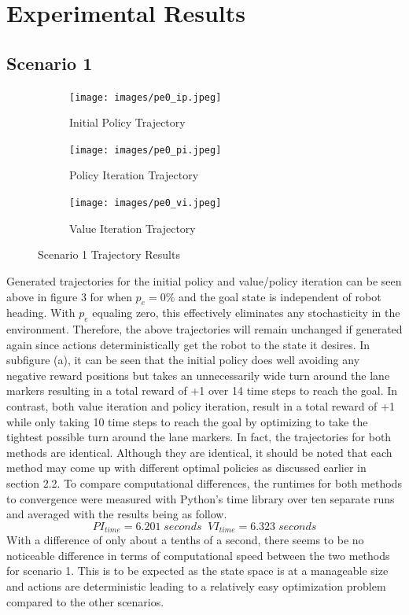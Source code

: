\documentclass[fullpage]{article}
\begin{document}
\section{Experimental Results}

\subsection{Scenario 1}

\begin{figure}[H]
\begin{subfigure}{.5\textwidth}
\centering
\texttt{[image: images/pe0\_ip.jpeg]}
\caption{Initial Policy Trajectory}
\label{fig:a}
\end{subfigure}
\begin{subfigure}{.5\textwidth}
\centering
\texttt{[image: images/pe0\_pi.jpeg]}
\caption{Policy Iteration Trajectory}
\label{fig:b}
\end{subfigure}
\begin{subfigure}{.5\textwidth}
\centering
\texttt{[image: images/pe0\_vi.jpeg]}
\caption{Value Iteration Trajectory}
\label{fig:c}
\end{subfigure}
\caption{Scenario 1 Trajectory Results}
\end{figure}

Generated trajectories for the initial policy and value/policy iteration can be seen above in figure 3 for when $p_e = 0\%$ and the goal state is independent of robot heading. With $p_e$ equaling zero, this effectively eliminates any stochasticity in the environment. Therefore, the above trajectories will remain unchanged if generated again since actions deterministically get the robot to the state it desires. In subfigure (a), it can be seen that the initial policy does well avoiding any negative reward positions but takes an unnecessarily wide turn around the lane markers resulting in a total reward of +1 over 14 time steps to reach the goal. In contrast, both value iteration and policy iteration, result in a total reward of +1 while only taking 10 time steps to reach the goal by optimizing to take the tightest possible turn around the lane markers. In fact, the trajectories for both methods are identical. Although they are identical, it should be noted that each method may come up with different optimal policies as discussed earlier in section 2.2.
To compare computational differences, the runtimes for both methods to convergence were measured with Python's time library over ten separate runs and averaged with the results being as follow.
\[
PI_{time} = 6.201 \; seconds \; \; VI_{time} = 6.323 \; seconds
\]
With a difference of only about a tenths of a second, there seems to be no noticeable difference in terms of computational speed between the two methods for scenario 1. This is to be expected as the state space is at a manageable size and actions are deterministic leading to a relatively easy optimization problem compared to the other scenarios.
\end{document}
